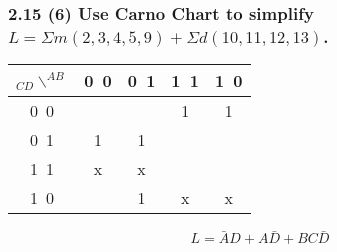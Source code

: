     \subsubsection{2.15 (6) \textnormal{Use Carno Chart to simplify $L=\Sigma m(2,3,4,5,9) + \Sigma d(10,11,12,13)$}.}
    {\color{hwSolution}
        \begin{center}
            \begin{tabular}{c|c c c c}
                $_{CD}\smallsetminus^{AB}$
                    & 0~0   & 0~1   & 1~1   & 1~0   \\
                \hline
                0~0 &       &       & 1     & 1     \\
                0~1 & 1     & 1     &       &       \\
                1~1 & x     & x     &       &       \\
                1~0 &       & 1     & x     & x     
            \end{tabular}
            \[L = \bar{A}D+A\bar{D}+BC\bar{D}\]
        \end{center}
    }